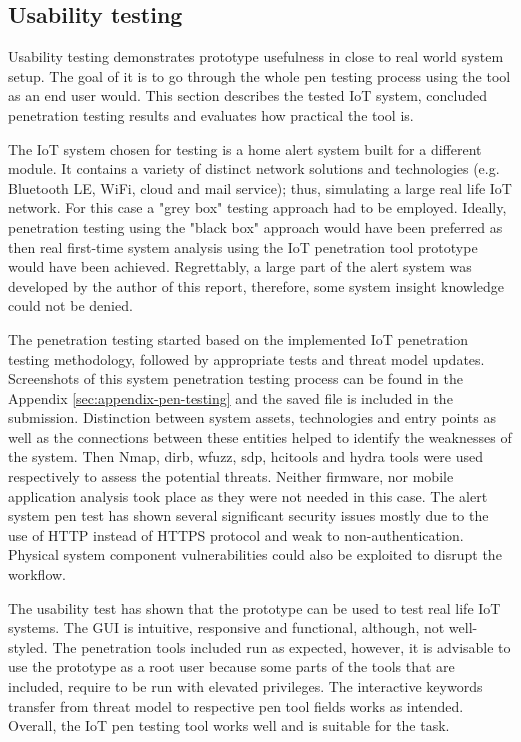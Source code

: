 \subsection{Usability testing}
	Usability testing demonstrates prototype usefulness in close to real world system setup. The goal of it is to go through the whole pen testing process using the tool as an end user would. This section describes the tested IoT system, concluded penetration testing results and evaluates how practical the tool is.
	
	The IoT system chosen for testing is a home alert system built for a different module. It contains a variety of distinct network solutions and technologies (e.g. Bluetooth LE, WiFi, cloud and mail service); thus, simulating a large real life IoT network. For this case a "grey box" testing approach had to be employed. Ideally, penetration testing using the "black box" approach would have been preferred as then real first-time system analysis using the IoT penetration tool prototype would have been achieved. Regrettably, a large part of the alert system was developed by the author of this report, therefore, some system insight knowledge could not be denied. 
	
	The penetration testing started based on the implemented IoT penetration testing methodology, followed by appropriate tests and threat model updates. Screenshots of this system penetration testing process can be found in the Appendix \ref{sec:appendix-pen-testing} and the saved file is included in the submission. 
	Distinction between system assets, technologies and entry points as well as the connections between these entities helped to identify the weaknesses of the system. Then Nmap, dirb, wfuzz, sdp, hcitools and hydra tools were used respectively to assess the potential threats. Neither firmware, nor mobile application analysis took place as they were not needed in this case.
	The alert system pen test has shown several significant security issues mostly due to the use of HTTP instead of HTTPS protocol and weak to non-authentication. Physical system component vulnerabilities could also be exploited to disrupt the workflow. 
	
	The usability test has shown that the prototype can be used to test real life IoT systems. The GUI is intuitive, responsive and functional, although, not well-styled. The penetration tools included run as expected, however, it is advisable to use the prototype as a root user because some parts of the tools that are included, require to be run with elevated privileges. The interactive keywords transfer from threat model to respective pen tool fields works as intended. Overall, the IoT pen testing tool works well and is suitable for the task.
